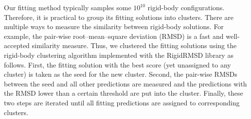 Our fitting method typically samples some $10^{10}$ rigid-body configurations. Therefore, it is practical to group its fitting solutions into clusters. There are multiple ways 
to measure the similarity between rigid-body solutions. For example, the pair-wise root--mean--square deviation (RMSD) is a fast and well-accepted similarity measure. 
Thus, we clustered the fitting solutions using the rigid-body clustering algorithm implemented with the RigidRMSD library \cite{popov2014rapid} as follows. 
%
First, the fitting solution with the best score (yet unassigned to any cluster) is taken as the seed for the new cluster. Second, the pair-wise RMSDs between the seed
and all other predictions are measured and the predictions with the RMSD lower than a certain threshold are put into the cluster. Finally, these two steps are iterated 
until all fitting predictions are assigned to corresponding clusters.
